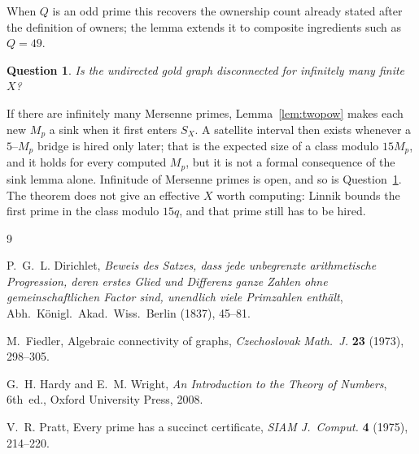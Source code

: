 \documentclass[11pt,a4paper]{article}
\newtheorem{question}{Question}
\begin{document}
When \(Q\) is an odd prime this recovers the ownership count already stated after the definition of owners; the lemma extends it to composite ingredients such as \(Q=49\).

\begin{question}
\label{q:infmany}
Is the undirected gold graph disconnected for infinitely many finite \(X\)?
\end{question}

If there are infinitely many Mersenne primes, Lemma~\ref{lem:twopow} makes each new \(M_p\) a sink when it first enters \(S_X\).
A satellite interval then exists whenever a \(5\)--\(M_p\) bridge is hired only later; that is the expected size of a class modulo \(15M_p\), and it holds for every computed \(M_p\), but it is not a formal consequence of the sink lemma alone.
Infinitude of Mersenne primes is open, and so is Question~\ref{q:infmany}.
The theorem does not give an effective \(X\) worth computing: Linnik bounds the first prime in the class modulo \(15q\), and that prime still has to be hired.


\begin{thebibliography}{9}

P.~G.~L. Dirichlet,
\emph{Beweis des Satzes, dass jede unbegrenzte arithmetische Progression, deren erstes Glied und Differenz ganze Zahlen ohne gemeinschaftlichen Factor sind, unendlich viele Primzahlen enth\"alt},
Abh.\ K\"onigl.\ Akad.\ Wiss.\ Berlin (1837), 45--81.

M.~Fiedler,
Algebraic connectivity of graphs,
\emph{Czechoslovak Math.\ J.} \textbf{23} (1973), 298--305.

G.~H. Hardy and E.~M. Wright,
\emph{An Introduction to the Theory of Numbers},
6th~ed., Oxford University Press, 2008.

V.~R. Pratt,
Every prime has a succinct certificate,
\emph{SIAM J.\ Comput.} \textbf{4} (1975), 214--220.

\end{thebibliography}
\end{document}

